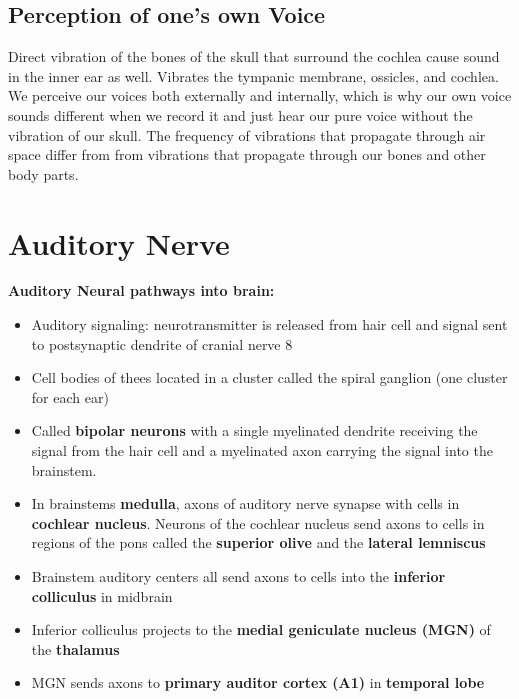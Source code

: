 \documentclass{article}
\begin{document}
\subsection{Perception of one's own Voice}

Direct vibration of the bones of the skull that surround the cochlea cause sound in the inner ear as well. 
Vibrates the tympanic membrane, ossicles, and cochlea. \\

\noindent We perceive our voices both externally and internally, which is why our own voice sounds different when we record it and just hear our pure voice without the vibration of our skull. The frequency of vibrations that propagate through air space differ from from vibrations that propagate through our bones and other body parts. \\

\newpage
\section{Auditory Nerve} 

\textbf{Auditory Neural pathways into brain:}
\begin{itemize}
    \item Auditory signaling: neurotransmitter is released from hair cell and signal sent to postsynaptic dendrite of cranial nerve 8
    \item Cell bodies of thees located in a cluster called the spiral ganglion (one cluster for each ear) 
    \item Called \textbf{bipolar neurons} with a single myelinated dendrite receiving the signal from the hair cell and a myelinated axon carrying the signal into the brainstem. 
    \item In brainstems \textbf{medulla}, axons of auditory nerve synapse with cells in \textbf{cochlear nucleus}. 
        \subitem Neurons of the cochlear nucleus send axons to cells in regions of the pons called the \textbf{superior olive} and the \textbf{lateral lemniscus}
    \item Brainstem auditory centers all send axons to cells into the \textbf{inferior colliculus} in midbrain 
    \item Inferior colliculus  projects to the \textbf{medial geniculate nucleus (MGN)} of the \textbf{thalamus}
    \item MGN sends axons to \textbf{primary auditor cortex (A1)} in \textbf{temporal lobe}
\end{itemize}
\end{document}

